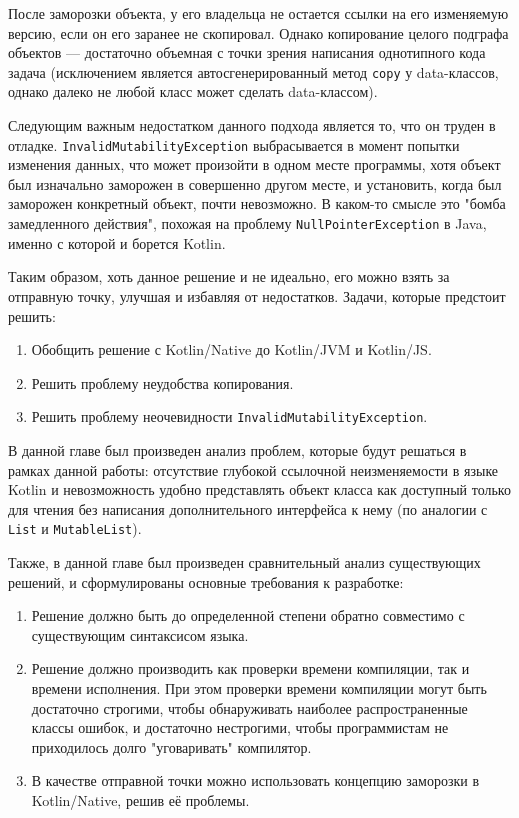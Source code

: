 \documentclass[specification,annotation,times]{itmo-student-thesis}
\begin{document}
После заморозки объекта, у его владельца не остается ссылки на его изменяемую версию, если он его заранее не скопировал.
Однако копирование целого подграфа объектов –-- достаточно объемная с точки зрения написания однотипного кода задача (исключением является автосгенерированный метод \texttt{copy} у data-классов, однако далеко не любой класс может сделать data-классом).

Следующим важным недостатком данного подхода является то, что он труден в отладке.
\texttt{InvalidMutabilityException} выбрасывается в момент попытки изменения данных, что может произойти в одном месте программы, хотя объект был изначально заморожен в совершенно другом месте, и установить, когда был заморожен конкретный объект, почти невозможно.
В каком-то смысле это "бомба замедленного действия", похожая на проблему \texttt{NullPointerException} в Java, именно с которой и борется Kotlin.

Таким образом, хоть данное решение и не идеально, его можно взять за отправную точку, улучшая и избавляя от недостатков. Задачи, которые предстоит решить:

\begin{enumerate}
	\item Обобщить решение с Kotlin/Native до Kotlin/JVM и Kotlin/JS.
	\item Решить проблему неудобства копирования.
	\item Решить проблему неочевидности \texttt{InvalidMutabilityException}.
\end{enumerate}



\finishrelatedwork

\chapterconclusion

В данной главе был произведен анализ проблем, которые будут решаться в рамках данной работы: отсутствие глубокой ссылочной неизменяемости в языке Kotlin и невозможность удобно представлять объект класса как доступный только для чтения без написания дополнительного интерфейса к нему (по аналогии с \texttt{List} и \texttt{MutableList}).

Также, в данной главе был произведен сравнительный анализ существующих решений, и сформулированы основные требования к разработке:

\begin{enumerate}
	\item Решение должно быть до определенной степени обратно совместимо с существующим синтаксисом языка.
	\item Решение должно производить как проверки времени компиляции, так и времени исполнения. При этом проверки времени компиляции могут быть достаточно строгими, чтобы обнаруживать наиболее распространенные классы ошибок, и достаточно нестрогими, чтобы программистам не приходилось долго "уговаривать" компилятор.  %
	\item В качестве отправной точки можно использовать концепцию заморозки в Kotlin/Native, решив её проблемы.
\end{enumerate}
\end{document}
